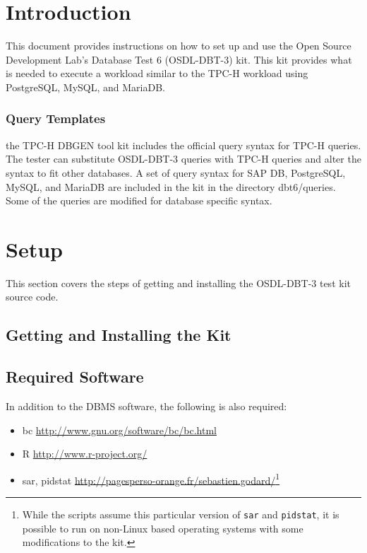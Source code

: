 \documentclass{article}
\begin{document}
\pagebreak

\tableofcontents

\section{Introduction}

This document provides instructions on how to set up and use the
Open Source Development Lab's Database Test 6
(OSDL-DBT-3) kit.  This kit provides what is needed to execute a
workload similar to the TPC-H workload using PostgreSQL, MySQL, and MariaDB.

\subsubsection{Query Templates}

the TPC-H DBGEN tool kit includes the official query syntax for TPC-H queries.
The tester can substitute OSDL-DBT-3 queries with TPC-H queries and alter the
syntax to fit other databases.  A set of query syntax for SAP DB, PostgreSQL,
MySQL, and MariaDB are included in the kit in the directory dbt6/queries.  Some
of the queries are modified for database specific syntax.

\section{Setup}

This section covers the steps of getting and installing the OSDL-DBT-3 test kit
source code.

\subsection{Getting and Installing the Kit}

\subsection{Required Software}

In addition to the DBMS software, the following is also required:
\begin{itemize}
  \item bc \url{http://www.gnu.org/software/bc/bc.html}
  \item R \url{http://www.r-project.org/}
  \item sar, pidstat \url{http://pagesperso-orange.fr/sebastien.godard/}\footnote{While the scripts assume this particular version of \texttt{sar} and \texttt{pidstat}, it is possible to run on non-Linux based operating systems with some modifications to the kit.}
\end{itemize}
\end{document}
